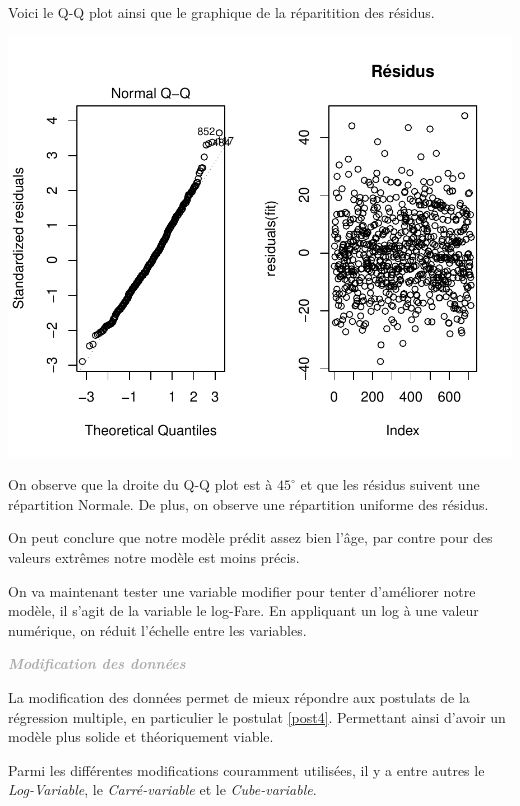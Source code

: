 \documentclass[11pt,french]{report}
\newenvironment{moreInfo}[1]
	{\begin{mdframed}
	\textcolor{darkgray}{\huge \raisebox{-3.5pt}{\faInfo} 
	\hspace{0.5cm} \large\bfseries #1}\\[5pt]
	\normalsize
	\makebox[0.1\textwidth][l]{}	
	\begin{minipage}{10cm}}
	{	\end{minipage}
	\end{mdframed}}
\begin{document}
\bigskip
Voici le Q-Q plot ainsi que le graphique de la réparitition des résidus.
\bigskip

\includegraphics{notes_de_cours-041}

\bigskip
On observe que la droite du Q-Q plot est à $45^\circ$ et que les résidus suivent une répartition Normale. De plus, on observe une répartition uniforme des résidus. \newline

On peut conclure que notre modèle prédit assez bien l'âge, par contre pour des valeurs extrêmes notre modèle est moins précis. \newline

On va maintenant tester une variable modifier pour tenter d'améliorer notre modèle, il s'agit de la variable le log-Fare. En appliquant un log à une valeur numérique, on réduit l'échelle entre les variables. 

\begin{moreInfo}{\emph{Modification des données}}
      La modification des données permet de mieux répondre aux postulats de la régression multiple, en particulier le postulat \ref{post4}. Permettant ainsi d'avoir un modèle plus solide et théoriquement viable.
      
      Parmi les différentes modifications couramment utilisées, il y a entre autres le \emph{Log-Variable}, le \emph{Carré-variable} et le \emph{Cube-variable}.
\end{moreInfo}
\end{document}
